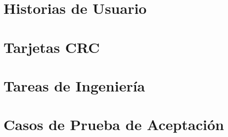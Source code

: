 \appendixes

\begin{addendum}
   
	\chapter{Historias de Usuario}
	\label{anx:historias_usuario}
	
	

	\chapter{Tarjetas CRC}
	\label{anx:tarjetas_crc}
	
	

	\chapter{Tareas de Ingeniería}
	\label{anx:tareas_ingenieria}
	
	

	\chapter{Casos de Prueba de Aceptación}
	\label{anx:casos_prueba}
	
	
\end{addendum}


